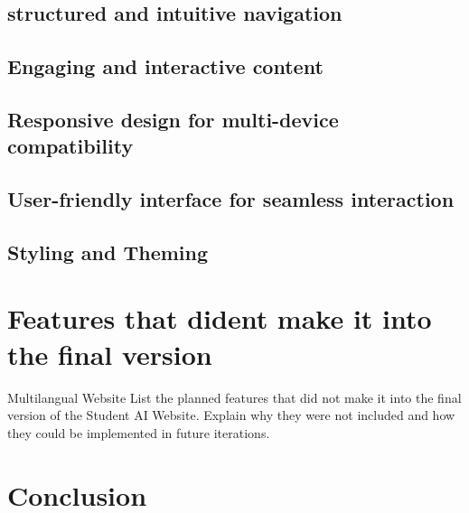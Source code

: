 
\subsection{structured and intuitive navigation}

\subsection{Engaging and interactive content}

\subsection{Responsive design for multi-device compatibility}

\subsection{User-friendly interface for seamless interaction}

\subsection{Styling and Theming}

\section{Features that dident make it into the final version}

Multilangual Website 
List the planned features that did not make it into the final version of the Student AI Website.
Explain why they were not included and how they could be implemented in future iterations.

\section{Conclusion}





